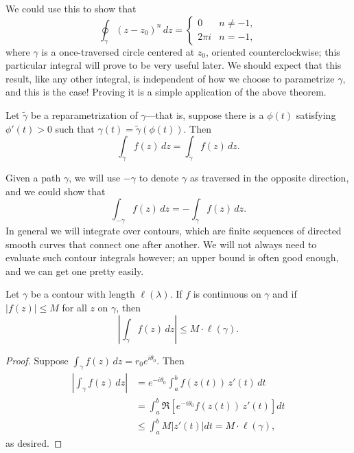 \documentclass[../m136main.tex]{subfiles}
\begin{document}
We could use this to show that
\[ \oint_\gamma (z - z_0)^{n} \, dz = \begin{cases} 0 & n \neq -1, \\ 2\pi i & n = -1, \end{cases} \] %
where $\gamma$ is a once-traversed circle centered at $z_0$, oriented counterclockwise; this particular integral will prove to be very useful later.
We should expect that this result, like any other integral, is independent of how we choose to parametrize $\gamma$, and this is the case!
Proving it is a simple application of the above theorem.

\pagebreak

\begin{corollary}[]
    Let $\tilde \gamma$ be a reparametrization of $\gamma$---that is, suppose there is a $\phi(t)$ satisfying $\phi'(t) > 0$ such that $\gamma(t) = \tilde \gamma(\phi(t))$.
    Then
    \[ \int_\gamma f(z) \,dz = \int_{\tilde \gamma} f(z) \,dz. \]
\end{corollary}

Given a path $\gamma$, we will use $-\gamma$ to denote $\gamma$ as traversed in the opposite direction, and we could show that
\[ \int_{-\gamma} f(z) \,dz = -\int_\gamma f(z) \,dz. \]
In general we will integrate over contours, which are finite sequences of directed smooth curves that connect one after another.
We will not always need to evaluate such contour integrals however; an upper bound is often good enough, and we can get one pretty easily.

\begin{lemma}[ML lemma]
    Let $\gamma$ be a contour with length $\ell(\lambda)$.
    If $f$ is continuous on $\gamma$ and if $|f(z)| \leq M$ for all $z$ on $\gamma$, then
    \[ \left| \int_\gamma f(z) \,dz \right| \leq M \cdot \ell(\gamma). \]
\end{lemma}

\begin{proof}
    Suppose $\int_\gamma f(z) \,dz = r_0 e^{i \theta_0}$.
    Then
    \begin{align*}
        \left| \int_\gamma f(z) \,dz \right| &= e^{-i\theta_0} \int_a^b f(z(t)) \,z'(t) \,dt \\
        &= \int_a^b \Re \left[ e^{-i\theta_0} f(z(t)) \, z'(t) \right] dt \\
        &\leq \int_a^b M \left| z'(t) \right| dt = M \cdot \ell(\gamma),
    \end{align*}
    as desired.
\end{proof}
\end{document}
